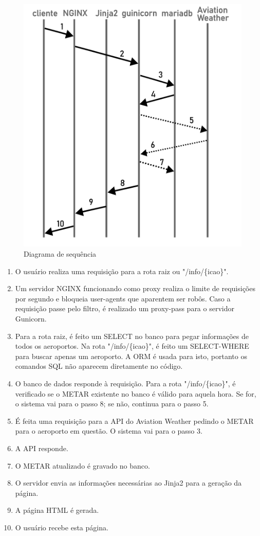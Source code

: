 \begin{figure}[ht]
    \begin{center}
    \includegraphics[width=0.5\linewidth]{img/diagrama-tempo.png}
    \caption{Diagrama de sequência}
    \label{fig:tempo}
    \end{center}
\end{figure}

\begin{enumerate}
\item O usuário realiza uma requisição para a rota raiz ou "/info/\{icao\}".
\item Um servidor NGINX funcionando como proxy realiza o limite de requisições por segundo
e bloqueia user-agents que aparentem ser robôs. Caso a requisição passe pelo filtro, é
realizado um proxy-pass para o servidor Gunicorn.
\item Para a rota raiz, é feito um SELECT no banco para pegar informações de todos os
aeroportos. Na rota "/info/\{icao\}", é feito um SELECT-WHERE para buscar apenas um aeroporto.
A ORM é usada para isto, portanto os comandos SQL não aparecem diretamente no código.
\item O banco de dados responde à requisição. Para a rota "/info/\{icao\}", é verificado 
se o METAR existente no banco é válido para aquela hora. Se for, o sistema vai para o passo 8;
se não, continua para o passo 5.
\item É feita uma requisição para a API do Aviation Weather pedindo o METAR para o 
aeroporto em questão. O sistema vai para o passo 3.
\item A API responde.
\item O METAR atualizado é gravado no banco.
\item O servidor envia as informações necessárias ao Jinja2 para a geração da página.
\item A página HTML é gerada.
\item O usuário recebe esta página.
\end{enumerate}
